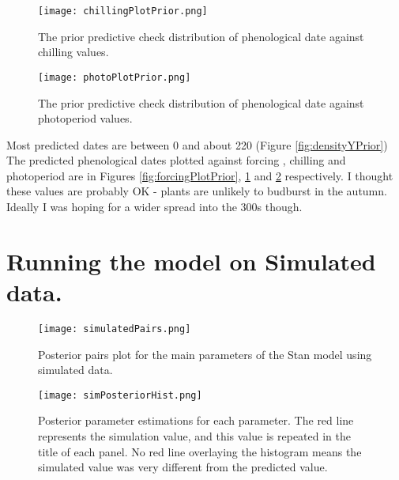 \documentclass{article}
\begin{document}
\begin{figure}[h!]
  \texttt{[image: chillingPlotPrior.png]}%
  \caption{The prior predictive check distribution of phenological date against chilling values. }
  \label{fig:chillingPlotPrior}
\end{figure}

\begin{figure}[h!]
  \texttt{[image: photoPlotPrior.png]}%
  \caption{The prior predictive check distribution of phenological date against photoperiod values. }
  \label{fig:photoPlotPrior}
\end{figure}

Most predicted dates are between 0 and about 220 (Figure \ref{fig:densityYPrior}) The predicted phenological dates plotted against forcing , chilling and photoperiod are in Figures \ref{fig:forcingPlotPrior}, \ref{fig:chillingPlotPrior} and \ref{fig:photoPlotPrior} respectively. I thought these values are probably OK - plants are unlikely to budburst in the autumn. Ideally I was hoping for a wider spread into the 300s though. 

\section{Running the model on Simulated data.}


\begin{figure}[h!]
  \texttt{[image: simulatedPairs.png]}%
  \caption{Posterior pairs plot for the main parameters of the Stan model using simulated data. }
  \label{fig:simulatedPairs}
\end{figure}

\begin{figure}[h!]
  \texttt{[image: simPosteriorHist.png]}%
  \caption{Posterior parameter estimations for each parameter. The red line represents the simulation value, and this value is repeated in the title of each panel. No red line overlaying the histogram means the simulated value was very different from the predicted value. }
  \label{fig:simPosteriorHist}
\end{figure}
\end{document}
